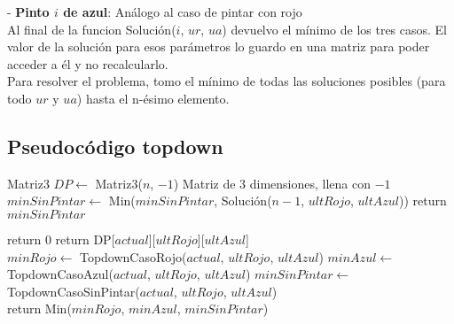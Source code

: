 - \textbf{Pinto $i$ de azul}:  Análogo al caso de pintar con rojo  \\

Al final de la funcion Solución($i$, $ur$, $ua$) devuelvo el mínimo de los tres casos. El valor de la solución para esos parámetros lo guardo en una matriz para poder acceder a él y no recalcularlo. \\

Para resolver el problema, tomo el mínimo de todas las soluciones posibles (para todo $ur$ y $ua$) hasta el n-ésimo elemento.

\subsection{Pseudocódigo topdown}

\begin{algorithm}[H]
\begin{algorithmic}
  \State Matriz3 $DP \gets$ Matriz3($n$, $-1$) \Comment Matriz de 3 dimensiones, llena con $-1$
            \State $minSinPintar \gets$ Min($minSinPintar$, Solución($n-1$, $ultRojo$, $ultAzul$))
        \EndFor
    \EndFor
    \State return $minSinPintar$
\EndProcedure
\end{algorithmic}
\end{algorithm} 


\begin{algorithm}[H]
\begin{algorithmic}
        return $0$
    \EndIf
        return DP[$actual$][$ultRojo$][$ultAzul$]
    \EndIf \\

    \State $minRojo \gets$ TopdownCasoRojo($actual$, $ultRojo$, $ultAzul$)
    \State $minAzul \gets$ TopdownCasoAzul($actual$, $ultRojo$, $ultAzul$)
    \State $minSinPintar \gets$ TopdownCasoSinPintar($actual$, $ultRojo$, $ultAzul$) \\

    \State return Min($minRojo$, $minAzul$, $minSinPintar$)
\EndProcedure
\end{algorithmic}
\end{algorithm} 



